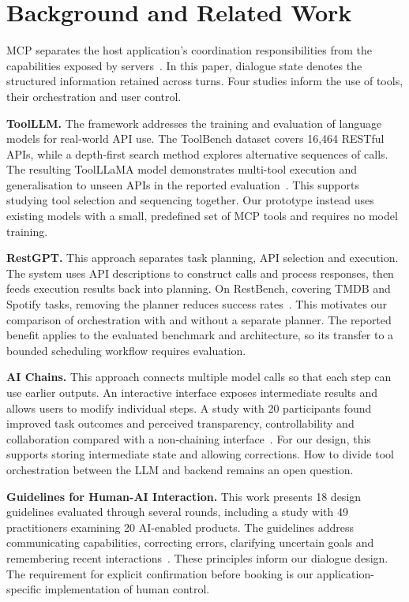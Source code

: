 \section{Background and Related Work}\label{sec:PreviousWork}
MCP separates the host application's coordination responsibilities from the capabilities exposed by servers~\cite{MCP2025Architecture}.
In this paper, dialogue state denotes the structured information retained across turns.
Four studies inform the use of tools, their orchestration and user control.

\textbf{ToolLLM.}
The framework addresses the training and evaluation of language models for real-world API use.
The ToolBench dataset covers 16,464 RESTful APIs, while a depth-first search method explores alternative sequences of calls.
The resulting ToolLLaMA model demonstrates multi-tool execution and generalisation to unseen APIs in the reported evaluation~\cite{qin2024toolllm}.
This supports studying tool selection and sequencing together.
Our prototype instead uses existing models with a small, predefined set of MCP tools and requires no model training.

\textbf{RestGPT.}
This approach separates task planning, API selection and execution.
The system uses API descriptions to construct calls and process responses, then feeds execution results back into planning.
On RestBench, covering TMDB and Spotify tasks, removing the planner reduces success rates~\cite{song2023restgpt}.
This motivates our comparison of orchestration with and without a separate planner.
The reported benefit applies to the evaluated benchmark and architecture, so its transfer to a bounded scheduling workflow requires evaluation.

\textbf{AI Chains.}
This approach connects multiple model calls so that each step can use earlier outputs.
An interactive interface exposes intermediate results and allows users to modify individual steps.
A study with 20 participants found improved task outcomes and perceived transparency, controllability and collaboration compared with a non-chaining interface~\cite{wu2022aichains}.
For our design, this supports storing intermediate state and allowing corrections.
How to divide tool orchestration between the LLM and backend remains an open question.

\textbf{Guidelines for Human-AI Interaction.}
This work presents 18 design guidelines evaluated through several rounds, including a study with 49 practitioners examining 20 AI-enabled products.
The guidelines address communicating capabilities, correcting errors, clarifying uncertain goals and remembering recent interactions~\cite{amershi2019guidelines}.
These principles inform our dialogue design.
The requirement for explicit confirmation before booking is our application-specific implementation of human control.

